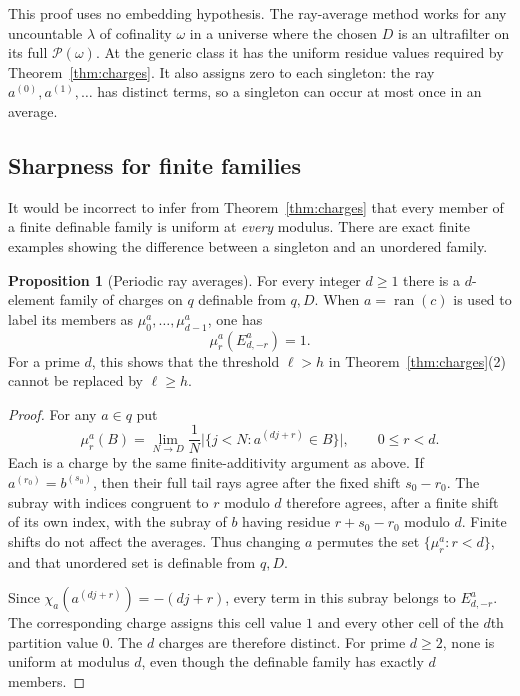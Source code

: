 \documentclass[11pt,letterpaper]{article}
\theoremstyle{definition}
\newtheorem{proposition}[definition]{Proposition}
\numberwithin{equation}{section}
\newcommand{\ran}{\operatorname{ran}}
\newcommand{\powerset}{\mathcal P}
\begin{document}
This proof uses no embedding hypothesis. The ray-average method works for
any uncountable $\lambda$ of cofinality $\omega$ in a universe where the
chosen $D$ is an ultrafilter on its full $\powerset(\omega)$. At the generic
class it has the uniform residue values required by
Theorem~\ref{thm:charges}. It also assigns zero to each singleton: the ray
$a^{(0)},a^{(1)},\ldots$ has distinct terms, so a singleton can occur at
most once in an average.

\subsection{Sharpness for finite families}

It would be incorrect to infer from Theorem~\ref{thm:charges} that every
member of a finite definable family is uniform at \emph{every} modulus.
There are exact finite examples showing the difference between a singleton
and an unordered family.

\begin{proposition}[Periodic ray averages]\label{prop:periodiccharges}
For every integer $d\ge1$ there is a $d$-element family of charges on $q$
definable from $q,D$. When $a=\ran(c)$ is used to label its members as
$\mu_0^a,\ldots,\mu_{d-1}^a$, one has
\[
 \mu_r^a(E^a_{d,-r})=1.
\]
For a prime $d$, this shows that the threshold $\ell>h$ in
Theorem~\ref{thm:charges}(2) cannot be replaced by $\ell\ge h$.
\end{proposition}

\begin{proof}
For any $a\in q$ put
\[
 \mu_r^a(B)=\lim_{N\to D}\frac1N
       \bigl|\{j<N:a^{(dj+r)}\in B\}\bigr|,
 \qquad 0\le r<d.
\]
Each is a charge by the same finite-additivity argument as above.
If $a^{(r_0)}=b^{(s_0)}$, then their full tail rays agree after the fixed
shift $s_0-r_0$. The subray with indices congruent to $r$ modulo $d$
therefore agrees, after a finite shift of its own index, with the subray
of $b$ having residue $r+s_0-r_0$ modulo $d$. Finite shifts do not affect
the averages. Thus changing $a$ permutes the set
$\{\mu_r^a:r<d\}$, and that unordered set is definable from $q,D$.

Since $\chi_a(a^{(dj+r)})=-(dj+r)$, every term in this subray belongs
to $E^a_{d,-r}$. The corresponding charge assigns this cell value $1$
and every other cell of the $d$th partition value $0$. The $d$ charges
are therefore distinct. For prime $d\ge2$, none is uniform at modulus
$d$, even though the definable family has exactly $d$ members.
\end{proof}
\end{document}
